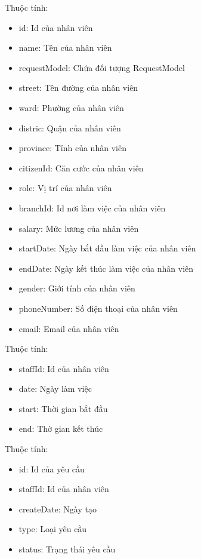 Thuộc tính:
\begin{itemize}
	\item id: Id của nhân viên
	\item name: Tên của nhân viên
	\item requestModel: Chứa đối tượng RequestModel
	\item street: Tên đường của nhân viên
	\item ward: Phường của nhân viên
	\item distric: Quận của nhân viên
	\item province: Tỉnh của nhân viên
	\item citizenId: Căn cước của nhân viên
	\item role: Vị trí của nhân viên
	\item branchId: Id nơi làm việc của nhân viên
	\item salary: Mức lương của nhân viên
	\item startDate: Ngày bắt đầu làm việc của nhân viên
	\item endDate: Ngày kết thúc làm việc của nhân viên
	\item gender: Giới tính của nhân viên
	\item phoneNumber: Số điện thoại của nhân viên
	\item email: Email của nhân viên
\end{itemize}


Thuộc tính:
\begin{itemize}
	\item staffId: Id của nhân viên
	\item date: Ngày làm việc
	\item start: Thời gian bắt đầu
	\item end: Thờ gian kết thúc
\end{itemize}

Thuộc tính:
\begin{itemize}
	\item id: Id của yêu cầu
	\item staffId: Id của nhân viên
	\item createDate: Ngày tạo
	\item type: Loại yêu cầu
	\item status: Trạng thái yêu cầu
\end{itemize}

